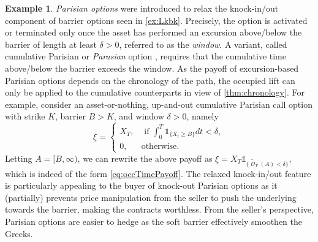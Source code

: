 \documentclass[11pt]{article}
\theoremstyle{plain}
\theoremstyle{definition}
\newtheorem{example}{Example}
\DeclareMathOperator{\calO}{\mathcal{O}}
\begin{document}
\begin{example} 
\textit{Parisian options} \cite{ChesneyJeanblancYor,Hugonnier} were introduced to relax the knock-in/out component of  barrier options seen in \cref{ex:Lkbk}. 
 Precisely, the option is activated or terminated only once the asset has performed an excursion above/below the barrier of length at least $\delta>0$, referred to as the \textit{window}. 
 A variant, called cumulative Parisian or \textit{Parasian} option \cite{haberWilmott},  requires that the cumulative time above/below the barrier exceeds the window. As the payoff of excursion-based Parisian options depends on the chronology of the path, the occupied lift can only be applied to the cumulative counterparts  in view of \cref{thm:chronology}. 
For example, consider   an asset-or-nothing, up-and-out cumulative Parisian call option with strike $K$, barrier  $B>K$, and window $\delta >0$, namely 
\begin{equation*}
   \xi = \begin{cases}
       X_T, & \text{ if } \int_0^T\mathds{1}_{\{X_t \ge B\}} dt <\delta,  \\
       0, & \text{otherwise.}
   \end{cases}
\end{equation*}
Letting $A = [B,\infty)$, we can rewrite the above  payoff  as 
$ \xi  =  X_T \mathds{1}_{\{\tilde{\calO}_T(A) < \delta  \}},$ which is indeed of the form \eqref{eq:occTimePayoff}.  
The relaxed knock-in/out feature is particularly appealing to the buyer of knock-out Parisian options as  it (partially) prevents  price manipulation from the seller  to push the underlying towards the barrier,  making the contracts  worthless. From the seller's perspective,  Parisian options are easier to hedge as the soft barrier effectively smoothen the Greeks. 

\end{example}
\end{document}
